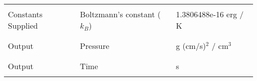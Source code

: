\begin{table*}[h]
\begin{scriptsize}
\begin{center}
\begin{tabular}{|l|l|l|}
          & & \\ \hline 
          & & \\
Constants Supplied & Boltzmann's constant ($k_B$)                   &  1.3806488e-16 erg / K \\
          & & \\ \hline 
          & & \\
Output            & Pressure                                        &  g (cm/s)$^2$ / cm$^3$ \\
          & & \\ \hline 
          & & \\
Output            & Time                                            &  s \\
          & & \\ \hline 
\end{tabular}
\label{Table:Units}
\end{center}
\end{scriptsize}
\end{table*}
